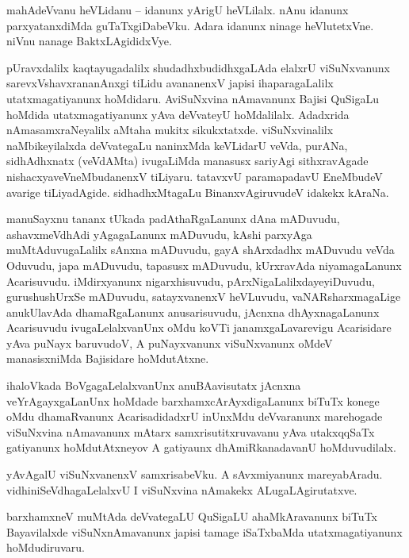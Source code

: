 \documentclass{article}
\begin{document}
\begin{mn}%
mahAdeVvanu heVLidanu -- idanunx yArigU heVLilalx. nAnu idanunx parxyatanxdiMda guTaTxgiDabeVku. 
Adara idanunx ninage heVlutetxVne. niVnu nanage BaktxLAgididxVye.
\end{mn}

\begin{mn}%
pUravxdalilx kaqtayugadalilx shudadhxbudidhxgaLAda elalxrU viSuNxvanunx sarevxVshavxrananAnxgi 
tiLidu avananenxV japisi ihaparagaLalilx utatxmagatiyanunx hoMdidaru. AviSuNxvina nAmavanunx Bajisi 
QuSigaLu hoMdida utatxmagatiyanunx yAva deVvateyU hoMdalilalx. Adadxrida nAmasamxraNeyalilx aMtaha 
mukitx sikukxtatxde. viSuNxvinalilx naMbikeyilalxda deVvategaLu naninxMda keVLidarU veVda, purANa, 
sidhAdhxnatx (veVdAMta) ivugaLiMda manasusx sariyAgi sithxravAgade nishacxyaveVneMbudanenxV 
tiLiyaru. tatavxvU paramapadavU EneMbudeV avarige tiLiyadAgide. sidhadhxMtagaLu BinanxvAgiruvudeV 
idakekx kAraNa.
\end{mn}

\begin{mn}%
manuSayxnu tananx tUkada padAthaRgaLanunx dAna mADuvudu, ashavxmeVdhAdi yAgagaLanunx mADuvudu, 
kAshi parxyAga muMtAduvugaLalilx sAnxna mADuvudu, gayA shArxdadhx mADuvudu veVda Oduvudu, japa 
mADuvudu, tapasusx mADuvudu, kUrxravAda niyamagaLanunx Acarisuvudu. iMdirxyanunx nigarxhisuvudu, 
pArxNigaLalilxdayeyiDuvudu, gurushushUrxSe mADuvudu, satayxvanenxV heVLuvudu, vaNARsharxmagaLige 
anukUlavAda dhamaRgaLanunx anusarisuvudu, jAcnxna dhAyxnagaLanunx Acarisuvudu ivugaLelalxvanUnx 
oMdu koVTi janamxgaLavarevigu Acarisidare yAva puNayx baruvudoV, A puNayxvanunx viSuNxvanunx oMdeV 
manasisxniMda Bajisidare hoMdutAtxne.
\end{mn}

\begin{mn}%
ihaloVkada BoVgagaLelalxvanUnx anuBAavisutatx jAcnxna veYrAgayxgaLanUnx hoMdade 
barxhamxcArAyxdigaLanunx biTuTx konege oMdu dhamaRvanunx AcarisadidadxrU inUnxMdu deVvaranunx 
marehogade viSuNxvina nAmavanunx mAtarx samxrisutitxruvavanu yAva utakxqqSaTx gatiyanunx 
hoMdutAtxneyov A gatiyaunx dhAmiRkanadavanU hoMduvudilalx.
\end{mn}

\begin{mn}%
yAvAgalU viSuNxvanenxV samxrisabeVku. A sAvxmiyanunx mareyabAradu. vidhiniSeVdhagaLelalxvU I 
viSuNxvina nAmakekx ALugaLAgirutatxve.
\end{mn}

\begin{mn}%
barxhamxneV muMtAda deVvategaLU QuSigaLU ahaMkAravanunx biTuTx Bayavilalxde viSuNxnAmavanunx japisi 
tamage iSaTxbaMda utatxmagatiyanunx hoMdudiruvaru.
\end{mn}
\end{document}
